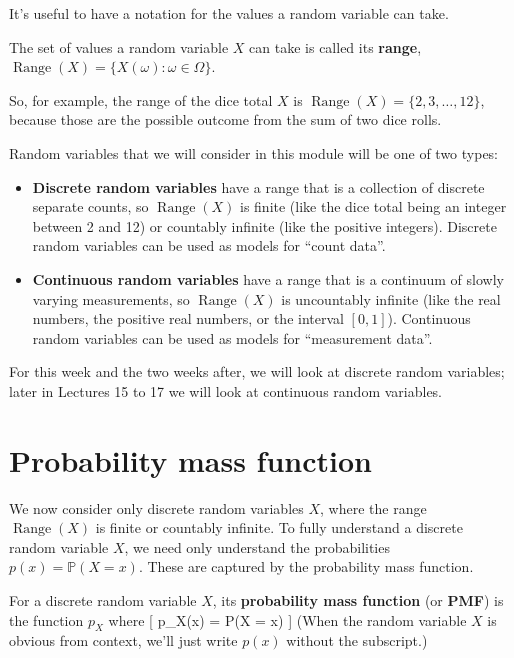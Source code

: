 \documentclass[
  letterpaper,
]{report}
\providecommand{\tightlist}{%
  \setlength{\itemsep}{0pt}\setlength{\parskip}{0pt}}\usepackage{longtable,booktabs,array}
\theoremstyle{definition}
\theoremstyle{definition}
\theoremstyle{remark}
\begin{document}
It's useful to have a notation for the values a random variable can
take.

\newcommand{\Range}{\operatorname{Range}}

The set of values a random variable \(X\) can take is called its
\textbf{range},
\(\operatorname{Range}(X) = \{X(\omega) : \omega \in \Omega \}\).

So, for example, the range of the dice total \(X\) is
\(\operatorname{Range}(X) = \{2, 3, \dots, 12\}\), because those are the
possible outcome from the sum of two dice rolls.

Random variables that we will consider in this module will be one of two
types:

\begin{itemize}
\tightlist
\item
  \textbf{Discrete random variables} have a range that is a collection
  of discrete separate counts, so \(\operatorname{Range}(X)\) is finite
  (like the dice total being an integer between 2 and 12) or countably
  infinite (like the positive integers). Discrete random variables can
  be used as models for ``count data''.
\item
  \textbf{Continuous random variables} have a range that is a continuum
  of slowly varying measurements, so \(\operatorname{Range}(X)\) is
  uncountably infinite (like the real numbers, the positive real
  numbers, or the interval \([0,1]\)). Continuous random variables can
  be used as models for ``measurement data''.
\end{itemize}

For this week and the two weeks after, we will look at discrete random
variables; later in Lectures 15 to 17 we will look at continuous random
variables.

\hypertarget{pmf}{%
\section{Probability mass function}\label{pmf}}

We now consider only discrete random variables \(X\), where the range
\(\operatorname{Range}(X)\) is finite or countably infinite. To fully
understand a discrete random variable \(X\), we need only understand the
probabilities \(p(x) = \mathbb P(X = x)\). These are captured by the
probability mass function.

For a discrete random variable \(X\), its \textbf{probability mass
function} (or \textbf{PMF}) is the function \(p_X\) where {[} p\_X(x) =
\mathbb P(X = x) \qquad {} {]}
(When the random variable \(X\) is obvious from context, we'll just
write \(p(x)\) without the subscript.)
\end{document}
